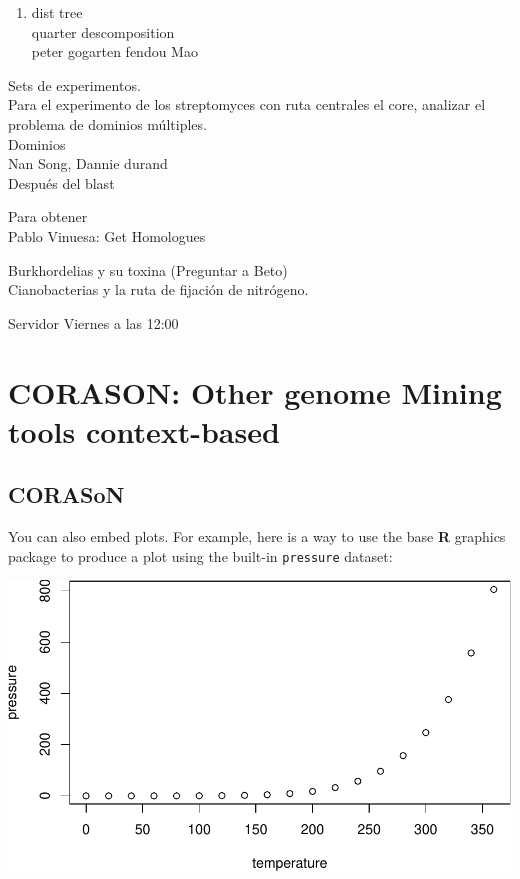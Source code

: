 \documentclass[12pt,twoside]{reedthesis}
\providecommand{\tightlist}{%
  \setlength{\itemsep}{0pt}\setlength{\parskip}{0pt}}
\begin{document}
  \begin{enumerate}
  \def\labelenumi{\arabic{enumi}.}
  \setcounter{enumi}{1}
  \tightlist
  \item
    dist tree\\
    quarter descomposition\\
    peter gogarten fendou Mao
  \end{enumerate}
  
  Sets de experimentos.\\
  Para el experimento de los streptomyces con ruta centrales el core,
  analizar el problema de dominios múltiples.\\
  Dominios\\
  Nan Song, Dannie durand\\
  Después del blast
  
  Para obtener\\
  Pablo Vinuesa: Get Homologues
  
  Burkhordelias y su toxina (Preguntar a Beto)\\
  Cianobacterias y la ruta de fijación de nitrógeno.
  
  Servidor Viernes a las 12:00
  
  \section{CORASON: Other genome Mining tools
  context-based}\label{corason-other-genome-mining-tools-context-based}
  
  \subsection{CORASoN}\label{corason}
  
  You can also embed plots. For example, here is a way to use the base
  \textbf{R} graphics package to produce a plot using the built-in
  \texttt{pressure} dataset:
  
  \begin{center}\includegraphics{tesis_files/figure-latex/pressure-1} \end{center}
  
\end{document}
